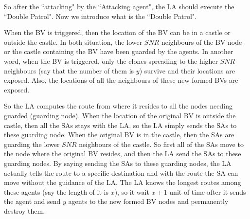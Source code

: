 So after the ``attacking" by the ``Attacking agent", the LA should execute the ``Double Patrol". Now we introduce what is the ``Double Patrol".




When the BV is triggered, then the location of the BV can be in a castle or outside the castle. In both situation, the lower $SNR$ neighbours of the BV node or the castle containing the BV have been guarded by the agents. In another word, when the BV is triggered, only the clones spreading to the higher $SNR$ neighbours (say that the number of them is $y$) survive and their locations are exposed. Also, the locations of all the neighbours of these new formed BVs are exposed. 

So the LA computes the route from where it resides to all the nodes needing guarded (guarding node). When the location of the original BV is outside the castle, then all the SAs stays with the LA, so the LA simply sends the SAs to these guarding node. When the original BV is in the castle, then the SAs are guarding the lower $SNR$ neighbours of the castle. So first all of the SAs move to the node where the original BV resides, and then the LA send the SAs to these guarding nodes. By saying sending the SAs to these guarding nodes, the LA actually tells the route to a specific destination and with the route the SA can move without the guidance of the LA. The LA knows the longest routes among these agents (say the length of it is $x$), so it wait $x+1$ unit of time after it sends the agent and send  $y$ agents to the new formed BV nodes and permanently destroy them.







 